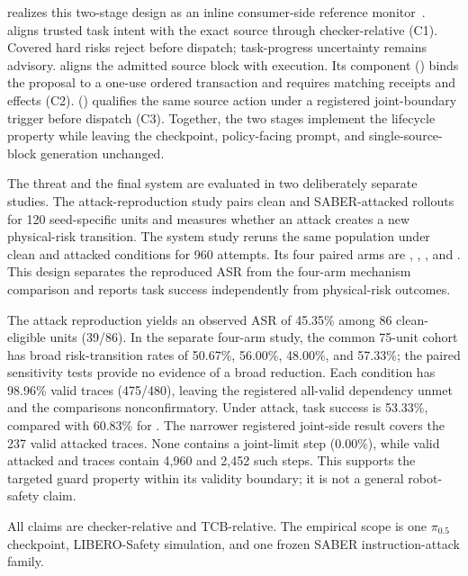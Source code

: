 \system realizes this two-stage design as an inline consumer-side reference
monitor~\cite{saltzer1975,schneider2000}.  \lone aligns trusted task intent with
the exact source \actionblock through checker-relative \taskassessment (C1).
Covered hard risks reject before dispatch; task-progress uncertainty remains
advisory.  \ltwo aligns the admitted source block with execution.  Its
\transactionbinding component (\ltwoa) binds the proposal to a one-use ordered
transaction and requires matching receipts and effects (C2).
\guardscreening (\ltwob) qualifies the same source action under a registered
joint-boundary trigger before dispatch (C3).  Together, the two stages implement
the \proofaligned lifecycle property while leaving the \vla checkpoint,
policy-facing prompt, and single-source-block generation unchanged.

The threat and the final system are evaluated in two deliberately separate
studies.  The attack-reproduction study pairs clean and SABER-attacked rollouts
for 120 seed-specific units and measures whether an attack creates a new
physical-risk transition.  The system study reruns the same population under
clean and attacked conditions for 960 attempts.  Its four paired arms are
\vlaonly, \loneonly, \ltwoonly, and \dual.  This design separates the reproduced
ASR from the four-arm mechanism comparison and reports task success independently
from physical-risk outcomes.

The attack reproduction yields an observed ASR of 45.35\% among 86
clean-eligible units (39/86).  In the separate four-arm study, the common
75-unit cohort has broad risk-transition rates of 50.67\%, 56.00\%, 48.00\%,
and 57.33\%; the paired sensitivity tests provide no evidence of a broad
reduction.  Each condition has 98.96\% valid traces (475/480), leaving the
registered all-valid dependency unmet and the comparisons nonconfirmatory.
Under attack, \dual task success is 53.33\%, compared with 60.83\% for
\vlaonly.  The narrower registered joint-side result covers the 237 valid
attacked \ltwoenabled traces.  None contains a joint-limit step (0.00\%), while
valid attacked \vlaonly and \loneonly traces contain 4,960 and 2,452 such
steps.  This supports the targeted guard property within its validity boundary;
it is not a general robot-safety claim.

All claims are checker-relative and TCB-relative.  The empirical scope is one
$\pi_{0.5}$ checkpoint, LIBERO-Safety simulation, and one frozen SABER
instruction-attack family.


